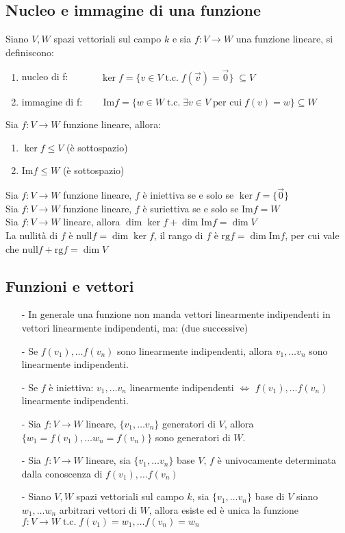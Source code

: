 \documentclass[a4paper]{article}
\newcommand\tc{\;\text{t.c.}\;} %
\newcommand\img{\text{Im}}		%
\newcommand\rg{\text{rg}} 		%
\newcommand\nul{\text{null}}	%
\begin{document}
\subsection{Nucleo e immagine di una funzione}
Siano \(V, W\) spazi vettoriali sul campo \(k\) e sia \(f: V \to W\) una funzione lineare, si definiscono:
\begin{enumerate}
	\item nucleo di f: \(\qquad \quad \ker f = \{ v \in V \tc f(\vec{v}) = \vec{0}\} \; \subseteq V\)
	\item immagine di f: \(\quad \;\;\;  \img f = \{ w \in W \tc \exists v \in V \; \text{per cui} \; f(v) = w\} \subseteq W\)
\end{enumerate}
Sia \(f: V \to W\) funzione lineare, allora:
\begin{enumerate}
	\item \(\ker f \leq V\) (è sottospazio)
	\item \(\img f \leq W\) (è sottospazio)
\end{enumerate}
Sia \(f: V \to W\) funzione lineare, \(f\) è iniettiva se e solo se \(\ker f = \{\vec{0}\}\) \\
Sia \(f: V \to W\) funzione lineare, \(f\) è suriettiva se e solo se \(\img f = W\) \\
Sia \(f: V \to W\) lineare, allora \(\dim \ker f + \dim \img f = \dim V\) \\
La nullità di \(f\) è \(\nul f = \dim \ker f\), il rango di \(f\) è \(\rg f = \dim \img f\), per cui vale che \(\nul f + \rg f = \dim V\)

\subsection{Funzioni e vettori}
\begin{itemize}[topsep=3pt, itemsep=0pt]
	\item[-] In generale una funzione non manda vettori linearmente indipendenti in vettori linearmente indipendenti, ma: (due successive)
	\item[-] Se \(f(v_1), \dots f(v_n)\) sono linearmente indipendenti, allora \(v_1, \dots v_n\) sono linearmente indipendenti.
	\item[-] Se \(f\) è iniettiva: \(v_1, \dots v_n\) linearmente indipendenti \(\Leftrightarrow\) \(f(v_1), \dots f(v_n)\) linearmente indipendenti.
	
	\item[-] Sia \(f: V \to W\) lineare, \(\{v_1, \dots v_n\}\) generatori di \(V\), allora \(\{w_1 = f(v_1), \dots w_n = f(v_n)\}\)
	sono generatori di \(W\).

	\item[-] Sia \(f: V \to W\) lineare, sia \(\{v_1, \dots v_n\}\) base \(V\), \(f\) è univocamente determinata dalla conoscenza di
	\(f(v_1), \dots f(v_n)\)

	\item[-] Siano \(V, W\) spazi vettoriali sul campo \(k\), sia \(\{v_1, \dots v_n\}\) base di \(V\) siano \(w_1, \dots w_n\)
	arbitrari vettori di \(W\), allora esiste ed è unica la funzione \(f: V \to W \tc f(v_1) = w_1, \dots f(v_n) = w_n\)
\end{itemize}
\end{document}
